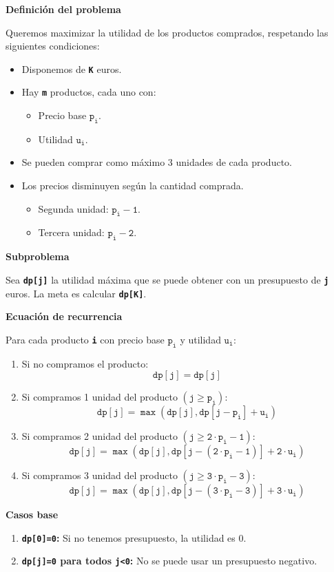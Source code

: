 \begin{enumerate}[label=\color{red}\textbf{\arabic*)}]
    \textbf{Definición del problema}

    Queremos maximizar la utilidad de los productos comprados, respetando las siguientes condiciones:
    \begin{itemize}[label=\textbullet]
        \item Disponemos de \textbf{\texttt{K}} euros.
        \item Hay \textbf{\texttt{m}} productos, cada uno con:
            \begin{itemize}[label=\textbullet]
                \item Precio base $\mathbf{\mathtt{p_i}}$.
                \item Utilidad $\mathbf{\mathtt{u_i}}$.
            \end{itemize}
        \item Se pueden comprar como máximo 3 unidades de cada producto.
        \item Los precios disminuyen según la cantidad comprada.
            \begin{itemize}[label=\textbullet]
                \item Segunda unidad: $\mathbf{\mathtt{p_i-1}}$.
                \item Tercera unidad: $\mathbf{\mathtt{p_i-2}}$.
            \end{itemize}
    \end{itemize}
    \textbf{Subproblema}

    Sea \textbf{\texttt{dp[j]}} la utilidad máxima que se puede obtener con un presupuesto de \textbf{\texttt{j}} euros. La meta es calcular \textbf{\texttt{dp[K]}}.

    \textbf{Ecuación de recurrencia}

    Para cada producto \textbf{\texttt{i}} con precio base $\mathbf{\mathtt{p_i}}$ y utilidad $\mathbf{\mathtt{u_i}}$:
    \begin{enumerate}[label=\arabic*)]
        \item Si no compramos el producto: \[
                \mathbf{\mathtt{dp[j]=dp[j]}}
        \] 
    \item Si compramos 1 unidad del producto $(\mathbf{\mathtt{j\ge p_i}})$: \[
            \mathbf{\mathtt{dp[j]=\max(dp[j], dp[j-p_i]+u_i)}}
    \] 
    \item Si compramos 2 unidad del producto $(\mathbf{\mathtt{j\ge 2\cdot p_i-1}})$: \[
            \mathbf{\mathtt{dp[j]=\max(dp[j], dp[j-(2\cdot p_i-1)]+2\cdot u_i)}}
    \] 
    \item Si compramos 3 unidad del producto $(\mathbf{\mathtt{j\ge 3\cdot p_i-3}})$: \[
            \mathbf{\mathtt{dp[j]=\max(dp[j], dp[j-(3\cdot p_i-3)]+3\cdot u_i)}}
    \] 
    \end{enumerate}
    \textbf{Casos base}
    \begin{enumerate}[label=\arabic*)]
    \item \textbf{\texttt{dp[0]=0}:} Si no tenemos presupuesto, la utilidad es 0.
    \item \textbf{\texttt{dp[j]=0} para todos \texttt{j<0}:} No se puede usar un presupuesto negativo.
    \end{enumerate}


\end{enumerate}

